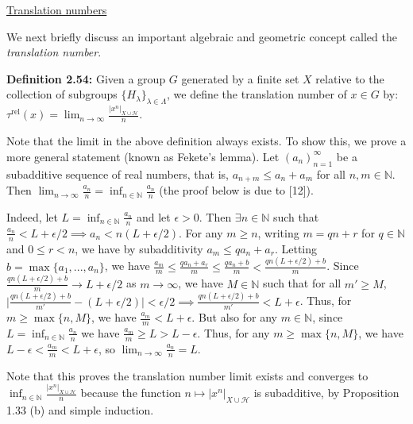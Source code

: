 \documentclass[12pt]{article}
\newcommand{\vs}{\vskip10pt}
\begin{document}
	\vs 
	
	\underline{Translation numbers}
	
	\vs 
	
	We next briefly discuss an important algebraic and geometric concept called the \textit{translation number}. 
	
	\vs 
	
	\textbf{Definition 2.54: } Given a group $G$ generated by a finite set $X$ relative to the collection of subgroups $\{H_{\lambda}\}_{\lambda \in \Lambda}$, we define the translation number of $x \in G$ by: $\tau^{\text{rel}}(x) = \lim_{n \rightarrow \infty} \frac{\vert x^n \vert_{X \cup \mathcal{H}}}{n}$. 
	
	\vs 
	
	Note that the limit in the above definition always exists. To show this, we prove a more general statement (known as Fekete's lemma). Let $(a_n)_{n=1}^{\infty}$ be a subadditive sequence of real numbers, that is, $a_{n+m} \leq a_n + a_m$ for all $n,m \in \mathbb{N}$. Then $\lim_{n \rightarrow \infty} \frac{a_n}{n} = \inf_{n \in \mathbb{N}} \frac{a_n}{n}$ (the proof below is due to [12]). 
	
	\vs 
	
	Indeed, let $L = \inf_{n \in \mathbb{N}} \frac{a_n}{n}$ and let $\epsilon > 0$. Then $\exists n \in \mathbb{N}$ such that $\frac{a_n}{n} < L + \epsilon/2 \implies a_n < n(L + \epsilon/2)$. For any $m \geq n$, writing $m = qn + r$ for $q \in \mathbb{N}$ and $0 \leq r < n$, we have by subadditivity $a_m \leq q a_n + a_r$. Letting $b = \max \{a_1,...,a_n\}$, we have $\frac{a_m}{m} \leq \frac{qa_n + a_r}{m} \leq \frac{qa_n + b}{m}< \frac{q n(L + \epsilon/2) + b}{m}$. Since $\frac{q n(L + \epsilon/2) + b}{m} \rightarrow L + \epsilon/2$ as $m \rightarrow \infty$, we have $M \in \mathbb{N}$ such that for all $m' \geq M$, $\vert \frac{q n(L + \epsilon/2) + b}{m'} - (L+\epsilon/2) \vert < \epsilon/2 \implies \frac{q n(L + \epsilon/2) + b}{m'} < L + \epsilon$. Thus, for $m \geq \max \{n, M\}$, we have $\frac{a_m}{m} < L + \epsilon$. But also for any $m \in \mathbb{N}$, since $L = \inf_{n \in \mathbb{N}} \frac{a_n}{n}$ we have $\frac{a_m}{m} \geq L > L - \epsilon$. Thus, for any $m \geq \max \{n, M\}$, we have $L - \epsilon < \frac{a_m}{m} < L + \epsilon$, so $\lim_{n \rightarrow \infty} \frac{a_n}{n} = L$.
	
	\vs 
	
	Note that this proves the translation number limit exists and converges to $\inf_{n \in \mathbb{N}} \frac{\vert x^n \vert_{X \cup \mathcal{H}}}{n}$ because the function $n \mapsto \vert x^n \vert_{X \cup \mathcal{H}}$ is subadditive, by Proposition 1.33 (b) and simple induction.
	
\end{document}
